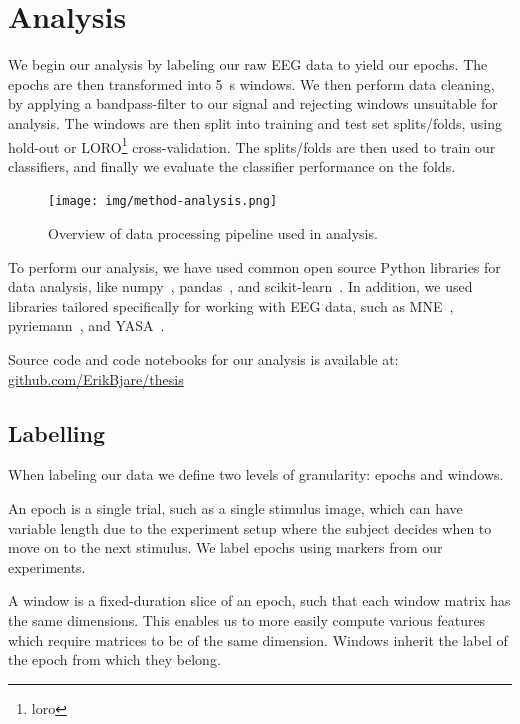 \vfill
\pagebreak
\section{Analysis}

    We begin our analysis by labeling our raw EEG data to yield our epochs. The epochs are then transformed into \SI{5}{\second} windows. We then perform data cleaning, by applying a bandpass-filter to our signal and rejecting windows unsuitable for analysis. The windows are then split into training and test set splits/folds, using hold-out or LORO\footnote{\gls{loro}} cross-validation. The splits/folds are then used to train our classifiers, and finally we evaluate the classifier performance on the folds.

    \begin{figure}[h]
        \centering
        \texttt{[image: img/method-analysis.png]}
        \caption{Overview of data processing pipeline used in analysis.}\label{fig:method-analysis}
    \end{figure}

    To perform our analysis, we have used common open source Python libraries for data analysis, like numpy~\cite{harris2020array}, pandas~\cite{reback2020pandas}, and scikit-learn~\cite{scikit-learn}. In addition, we used libraries tailored specifically for working with EEG data, such as MNE~\cite{noauthor_mne-python_2020}, pyriemann~\cite{alexandre_barachant_2020_3715511}, and YASA~\cite{vallat_yasa_2020}.

    Source code and code notebooks for our analysis is available at: \href{https://github.com/ErikBjare/thesis}{github.com/ErikBjare/thesis}

    \subsection{Labelling}
        When labeling our data we define two levels of granularity: epochs and windows.

        An epoch is a single trial, such as a single stimulus image, which can have variable length due to the experiment setup where the subject decides when to move on to the next stimulus. We label epochs using markers from our experiments.

        A window is a fixed-duration slice of an epoch, such that each window matrix has the same dimensions. This enables us to more easily compute various features which require matrices to be of the same dimension. Windows inherit the label of the epoch from which they belong.

